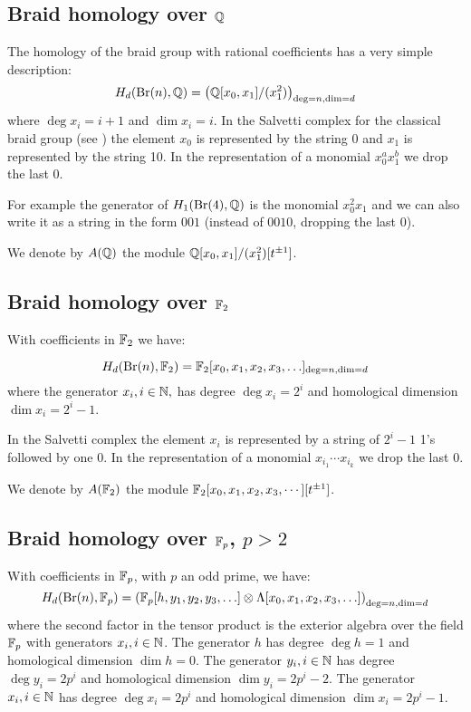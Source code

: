 \subsection{Braid homology over ${\mathbb{Q}}$}\label{ss:braid_homol}

The homology of the braid group with rational coefficients has a very simple description:
$$
H_d(\operatorname{Br}(n), {\mathbb{Q}})= \left( {\mathbb{Q}}[x_0, x_1]/(x_1^2)\right)_{\deg = n, \dim= d}
$$
where $\deg x_i = i+1 $ and $\dim x_i = i$.
In the Salvetti complex for the classical braid group (see \cite{salvetti, dps} ) the element $x_0$ is represented by the string 0 and $x_1$ is 
represented by the string 10. In the representation of a monomial $x_0^ax_{1}^b$ we drop the last 0.

For example the generator of $H_1(\operatorname{Br}(4),{\mathbb{Q}})$ is the monomial $x_0^2x_1$ and we can also write it as a string in the form $001$ (instead of $0010$, dropping the last $0$).

We denote by $A({\mathbb{Q}})$ the module ${\mathbb{Q}}[x_0, x_1]/(x_1^2)[t^{\pm 1}]$.


\subsection{Braid homology over $\mathbb{F}_2$}

With coefficients in $\mathbb{F}_2$ we have:

$$
H_d(\operatorname{Br}(n), \mathbb{F}_2)= \mathbb{F}_2[x_0, x_1, x_2, x_3, \ldots]_{\deg = n, \dim= d}
$$
where the generator $x_i, i \in {\mathbb{N}},$ has degree $\deg x_i = 2^i$ and homological dimension 
$\dim x_i = 2^i-1$.

In the Salvetti complex the element $x_i$ is represented by a string of $2^i -1$ 1's 
followed by one 0. In the representation of a monomial $x_{i_1}\cdots x_{i_k}$ we drop the last 0. 


We denote by $A(\mathbb{F}_2)$ the module $\mathbb{F}_2[x_0, x_1, x_2, x_3, \cdots][t^{\pm 1}]$.

\subsection{Braid homology over $\mathbb{F}_p$, $p>2$}

With coefficients in $\mathbb{F}_p$, with $p$ an odd prime, we have:
$$
H_d(\operatorname{Br}(n), \mathbb{F}_p)= \left( \mathbb{F}_p[h, y_1, y_2, y_3, \ldots] \otimes \Lambda[x_0, x_1, x_2, x_3, \ldots] 
\right)_{\deg = n, \dim= d}
$$
where the second factor in the tensor product is the exterior algebra over the field $\mathbb{F}_p$ 
with generators $x_i, i \in{\mathbb{N}}$. 
The generator $h$ has degree $\deg h = 1$ and homological dimension $\dim h=0$.
The generator $y_i, i \in {\mathbb{N}}$ has degree $\deg y_i = 2p^i$ and homological dimension 
$\dim y_i = 2p^i-2$.
The generator $x_i, i \in {\mathbb{N}}$ has degree $\deg x_i = 2p^i$ and homological dimension 
$\dim x_i = 2p^i-1$.

